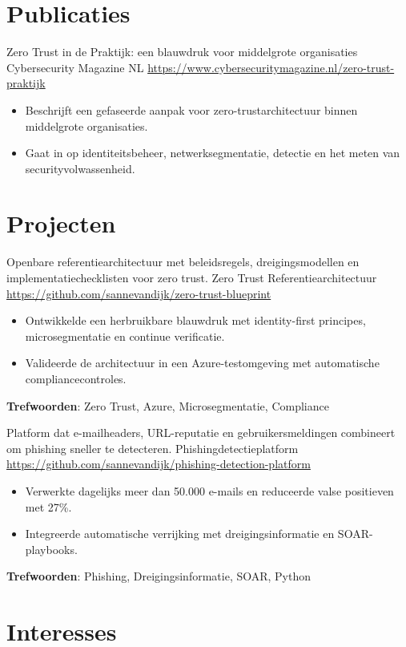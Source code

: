 \documentclass[a4paper, serif, 10pt]{moderncv}
\begin{document}
\section{Publicaties}

        {Zero Trust in de Praktijk: een blauwdruk voor middelgrote organisaties}
        {Cybersecurity Magazine NL}
        {\url{https://www.cybersecuritymagazine.nl/zero-trust-praktijk}}
        {}
        {\begin{itemize}
\item Beschrijft een gefaseerde aanpak voor zero-trustarchitectuur binnen middelgrote organisaties.
\item Gaat in op identiteitsbeheer, netwerksegmentatie, detectie en het meten van securityvolwassenheid.
\end{itemize}}
\section{Projecten}

        {Openbare referentiearchitectuur met beleidsregels, dreigingsmodellen en implementatiechecklisten voor zero trust.}
        {Zero Trust Referentiearchitectuur}
        {\url{https://github.com/sannevandijk/zero-trust-blueprint}}
        {}
        {\begin{itemize}
\item Ontwikkelde een herbruikbare blauwdruk met identity-first principes, microsegmentatie en continue verificatie.
\item Valideerde de architectuur in een Azure-testomgeving met automatische compliancecontroles.
\end{itemize}
\textbf{Trefwoorden}: Zero Trust, Azure, Microsegmentatie, Compliance}

        {Platform dat e-mailheaders, URL-reputatie en gebruikersmeldingen combineert om phishing sneller te detecteren.}
        {Phishingdetectieplatform}
        {\url{https://github.com/sannevandijk/phishing-detection-platform}}
        {}
        {\begin{itemize}
\item Verwerkte dagelijks meer dan 50.000 e-mails en reduceerde valse positieven met 27\%.
\item Integreerde automatische verrijking met dreigingsinformatie en SOAR-playbooks.
\end{itemize}
\textbf{Trefwoorden}: Phishing, Dreigingsinformatie, SOAR, Python}
\section{Interesses}
\end{document}

